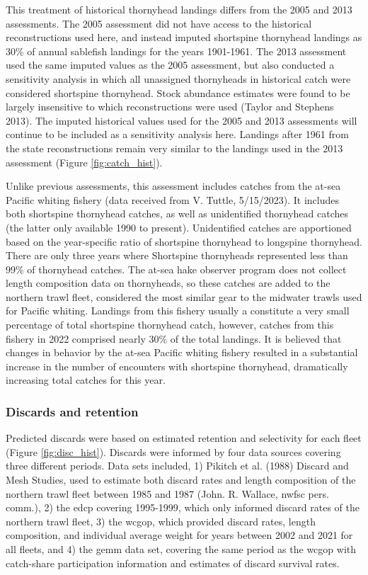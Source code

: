 \documentclass[11pt,
  english,
  letterpaper,
]{article}
\begin{document}
This treatment of historical thornyhead landings differs from the 2005 and 2013 assessments. The 2005 assessment did not have access to the historical reconstructions used here, and instead imputed shortspine thornyhead landings as 30\% of annual sablefish landings for the years 1901-1961. The 2013 assessment used the same imputed values as the 2005 assessment, but also conducted a sensitivity analysis in which all unassigned thornyheads in historical catch were considered shortspine thornyhead. Stock abundance estimates were found to be largely insensitive to which reconstructions were used (Taylor and Stephens 2013). The imputed historical values used for the 2005 and 2013 assessments will continue to be included as a sensitivity analysis here. Landings after 1961 from the state reconstructions remain very similar to the landings used in the 2013 assessment (Figure \ref{fig:catch_hist}).

Unlike previous assessments, this assessment includes catches from the at-sea Pacific whiting fishery (data received from V. Tuttle, 5/15/2023). It includes both shortspine thornyhead catches, as well as unidentified thornyhead catches (the latter only available 1990 to present). Unidentified catches are apportioned based on the year-specific ratio of shortspine thornyhead to longspine thornyhead. There are only three years where Shortspine thornyheads represented less than 99\% of thornyhead catches. The at-sea hake observer program does not collect length composition data on thornyheads, so these catches are added to the northern trawl fleet, considered the most similar gear to the midwater trawls used for Pacific whiting. Landings from this fishery usually a constitute a very small percentage of total shortspine thornyhead catch, however, catches from this fishery in 2022 comprised nearly 30\% of the total landings. It is believed that changes in behavior by the at-sea Pacific whiting fishery resulted in a substantial increase in the number of encounters with shortspine thornyhead, dramatically increasing total catches for this year.

\hypertarget{discards-and-retention}{%
\subsubsection{Discards and retention}\label{discards-and-retention}}

Predicted discards were based on estimated retention and selectivity for each fleet (Figure \ref{fig:disc_hist}). Discards were informed by four data sources covering three different periods. Data sets included, 1) Pikitch et al. (1988) Discard and Mesh Studies, used to estimate both discard rates and length composition of the northern trawl fleet between 1985 and 1987 (John. R. Wallace, \gls{nwfsc} pers. comm.), 2) the \gls{edcp} covering 1995-1999, which only informed discard rates of the northern trawl fleet, 3) the \gls{wcgop}, which provided discard rates, length composition, and individual average weight for years between 2002 and 2021 for all fleets, and 4) the \gls{gemm} data set, covering the same period as the \gls{wcgop} with catch-share participation information and estimates of discard survival rates.
\end{document}
